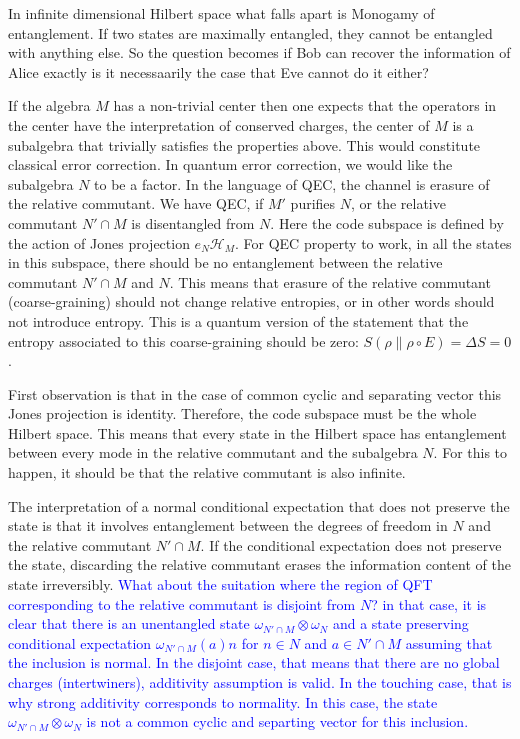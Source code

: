 \documentclass[a4paper,11pt]{article}
\theoremstyle{definition}
\newcommand{\mH}{\mathcal{H}}
\newcommand{\NL}[1]{\textcolor{blue}{#1}}
\begin{document}
In infinite dimensional Hilbert space what falls apart is Monogamy of entanglement. If two states are maximally entangled, they cannot be entangled with anything else. So the question becomes if Bob can recover the information of Alice exactly is it necessaarily the case that Eve cannot do it either? 

If the algebra $M$ has a non-trivial center then one expects that the operators in the center have the interpretation of conserved charges, the center of $M$ is a subalgebra that trivially satisfies the properties above. This would constitute classical error correction. In quantum error correction, we would like the subalgebra $N$ to be a factor. In the language of QEC, the channel is erasure of the relative commutant. We have QEC, if $M'$ purifies $N$, or the relative commutant $N'\cap M$ is disentangled from $N$. Here the code subspace is defined by the action of Jones projection $e_N\mH_M$. For QEC property to work, in all the states in this subspace, there should be no entanglement between the relative commutant $N'\cap M$ and $N$. This means that erasure of the relative commutant (coarse-graining) should not change relative entropies, or in other words should not introduce entropy. This is a quantum version of the statement that the entropy associated to this coarse-graining should be zero: $S(\rho\|\rho\circ E)=\Delta S=0$.

First observation is that in the case of common cyclic and separating vector this Jones projection is identity. Therefore, the code subspace must be the whole Hilbert space. This means that every state in the Hilbert space has entanglement between every mode in the relative commutant and the subalgebra $N$. For this to happen, it should be that the relative commutant is also infinite.

The interpretation of a normal conditional expectation that does not preserve the state is that it involves entanglement between the degrees of freedom in $N$ and the relative commutant $N'\cap M$. If the conditional expectation does not preserve the state, discarding the relative commutant erases the information content of the state irreversibly. \NL{What about the suitation where the region of QFT corresponding to the relative commutant is disjoint from $N$? in that case, it is clear that there is an unentangled state $\omega_{N'\cap M}\otimes \omega_N$ and a state preserving conditional expectation $\omega_{N'\cap M}(a)n$ for $n\in N$ and $a\in N'\cap M$ assuming that the inclusion is normal. In the disjoint case, that means that there are no global charges (intertwiners), additivity assumption is valid. In the touching case, that is why strong additivity corresponds to normality. In this case, the state $\omega_{N'\cap M}\otimes \omega_N$ is not a common cyclic and separting vector for this inclusion.} 
\end{document}
